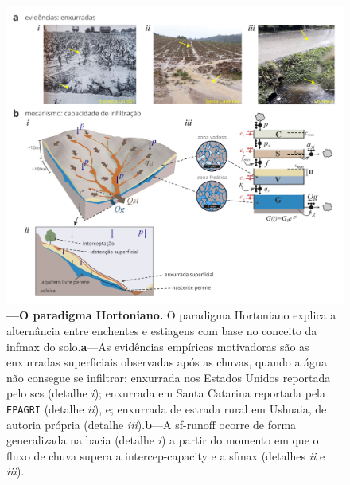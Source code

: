 \documentclass[./main.tex]{subfiles}
\begin{document}
\begin{figure}[t!] 
\centering				
\includegraphics[width=0.98\linewidth]{figs/fig_horton.jpg}		
\caption[O paradigma Hortoniano]
{
\textbf{---\;O paradigma Hortoniano.} O paradigma Hortoniano explica a alternância entre enchentes e estiagens com base no conceito da \gls{infmax} do solo.\;\textbf{a}\;---\;As evidências empíricas motivadoras são as enxurradas superficiais observadas após as chuvas, quando a água não consegue se infiltrar: enxurrada nos Estados Unidos reportada pelo \acrshort{scs} \cite{strahler1986} (detalhe \textrm{\textit{i}}); enxurrada em Santa Catarina reportada pela \texttt{EPAGRI} \cite{epagri2024} (detalhe \textrm{\textit{ii}}), e; enxurrada de estrada rural em Ushuaia, de autoria própria (detalhe \textrm{\textit{iii}}).\;\textbf{b}\;---\;A \gls{sf-runoff} ocorre de forma generalizada na bacia (detalhe \textrm{\textit{i}}) a partir do momento em que o fluxo de chuva supera a \gls{intercep-capacity} e a \gls{sfmax} (detalhes \textrm{\textit{ii}} e \textrm{\textit{iii}}).
}
\label{fig:hydro:horton} 		
\end{figure}
\end{document}
